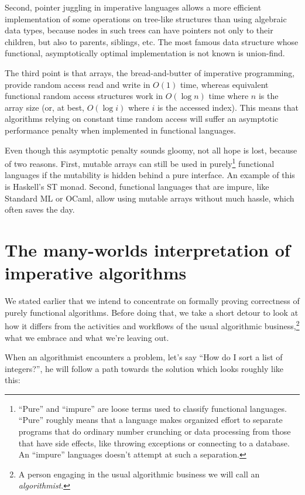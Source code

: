 \documentclass[declaration,mgr,english,shortabstract]{iithesis}
\begin{document}
Second, pointer juggling in imperative languages allows a more efficient implementation of some operations on tree-like structures than using algebraic data types, because nodes in such trees can have pointers not only to their children, but also to parents, siblings, etc. The most famous data structure whose functional, asymptotically optimal implementation is not known is union-find. \cite{FunctionalUnionFind}

The third point is that arrays, the bread-and-butter of imperative programming, provide random access read and write in $O(1)$ time, whereas equivalent functional random access structures work in $O(\log n)$ time where $n$ is the array size (or, at best, $O(\log i)$ where $i$ is the accessed index). This means that algorithms relying on constant time random access will suffer an asymptotic performance penalty when implemented in functional languages. \cite{Pippenger}

Even though this asymptotic penalty sounds gloomy, not all hope is lost, because of two reasons. First, mutable arrays can still be used in purely\footnote{``Pure'' and ``impure'' are loose terms used to classify functional languages. ``Pure'' roughly means that a language makes organized effort to separate programs that do ordinary number crunching or data processing from those that have side effects, like throwing exceptions or connecting to a database. An ``impure'' languages doesn't attempt at such a separation.} functional languages if the mutability is hidden behind a pure interface. An example of this is Haskell's ST monad. \cite{STMonad} Second, functional languages that are impure, like Standard ML or OCaml, allow using mutable arrays without much hassle, which often saves the day.

\section{The many-worlds interpretation of imperative algorithms} \label{worlds}

We stated earlier that we intend to concentrate on formally proving correctness of purely functional algorithms. Before doing that, we take a short detour to look at how it differs from the activities and workflows of the usual algorithmic business,\footnote{A person engaging in the usual algorithmic business we will call an \textit{algorithmist}.} what we embrace and what we're leaving out.

When an algorithmist encounters a problem, let's say ``How do I sort a list of integers?'', he will follow a path towards the solution which looks roughly like this:
\end{document}
